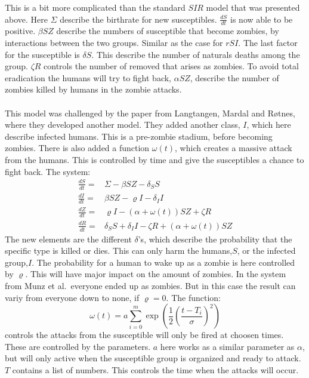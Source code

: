 \documentclass[%
twoside,                 %
final,                   %
10pt]{article}
\begin{document}
This is a bit more complicated than the standard $SIR$ model that was presented above. Here $\Sigma$ describe the birthrate for new susceptibles. $\frac{dS}{dt}$ is now able to be positive. $\beta SZ$ describe the numbers of susceptible that become zombies, by interactions between the two groups. Similar as the case for $rSI$. The last factor for the susceptible is $\delta S$. This describe the number of naturals deaths among the group. $\zeta R$ controls the number of removed that arises as zombies. To avoid total eradication the humans will try to fight back, $\alpha SZ$, describe the number of zombies killed by humans in the zombie attacks. 
\\
\\
This model was challenged by the paper from Langtangen, Mardal and Røtnes, where they developed another model. They added another class, $I$, which here describe infected humans. This is a pre-zombie stadium, before becoming zombies. There is also added a function $\omega(t)$, which creates a massive attack from the humans. This is controlled by time and give the susceptibles a chance to fight back. The system:
\begin{align*} \label{eq: LMR_model}
\frac{dS}{dt} =& \Sigma -\beta SZ - \delta_SS \\
\frac{dI}{dt} =& \beta SZ - \varrho I - \delta_II\\
\frac{dZ}{dt} =& \varrho I- (\alpha+\omega(t))SZ + \zeta R\\
\frac{dR}{dt} =& \delta_SS +\delta_II -\zeta R + (\alpha+\omega(t))SZ 
\end{align*}
The new elements are the different $\delta$'s, which describe the probability that the specific type is killed or dies. This can only harm the humans,$S$, or the infected group,$I$. The probability for a human to wake up as a zombie is here controlled by $\varrho$. This will have major impact on the amount of zombies. In the system from Munz et al.~everyone ended up as zombies. But in this case the result can variy from everyone down to none, if $\varrho=0$. The function:
\begin{equation}
\omega(t) = a \sum^m_{i=0}\exp\left(\frac{1}{2}\left(\frac{t-T_i}{\sigma}\right)^2\right)
\end{equation}
controls the attacks from the susceptible will only be fired at choosen times. These are controlled by the parameters. $a$ here works as a similar parameter as $\alpha$, but will only active when the susceptible group is organized and ready to attack. $T$ contains a list of numbers. This controls the time when the attacks will occur.
\\
\\
\end{document}
